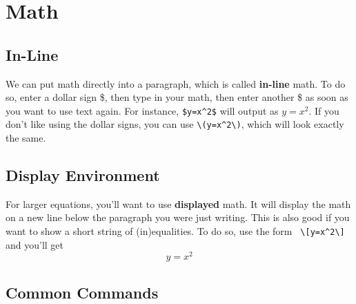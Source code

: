 \documentclass[12pt]{article}
\begin{document}
\section{Math}


\subsection{In-Line}

We can put math directly into a paragraph, which is called \textbf{in-line} math. 
To do so, enter a dollar sign \$, then type in your math, then enter another \$ as 
soon as you want to use text again. For instance, \verb|$y=x^2$|  will output as 
$y=x^2$. If you don't like using the dollar signs, you can use \verb|\(y=x^2\)|, 
which will look exactly the same.  


\subsection{Display Environment}

For larger equations, you'll want to use \textbf{displayed} math. It will display the 
math on a new line below the paragraph you were just writing. This is also good 
if you want to show a short string of (in)equalities.  To do so, use the form 
\verb| \[y=x^2\]| and you'll get
		\[y=x^2\]


\subsection{Common Commands}
\end{document}
